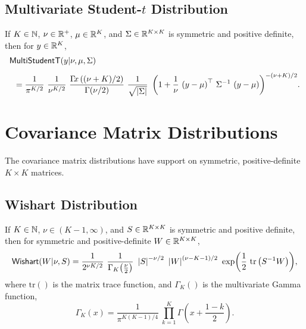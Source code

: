 \subsection{Multivariate Student-$t$ Distribution}

If $K \in \mathbb{N}$, $\nu \in \mathbb{R}^+$, $\mu \in \mathbb{R}^K$, and $\Sigma
\in \mathbb{R}^{K \times K}$ is symmetric and positive definite, then for
$y \in \mathbb{R}^K$,
\[
\begin{array}{l}
\mbox{\sf MultiStudentT}(y|\nu,\mu,\Sigma)
\\[8pt]
\displaystyle
\hspace*{8pt}
=
\frac{1}{\pi^{K/2}}
\
\frac{1}{\nu^{K/2}}
\
\frac{\Gamma\!x\left((\nu + K)/2\right)}
     {\Gamma(\nu/2)}
\
\frac{1}{\sqrt{\left| \Sigma \right|}}
\
\left(
1 + \frac{1}{\nu} \, \left(y - \mu\right)^{\top} \, \Sigma^{-1} \, \left(y - \mu\right)
\right)^{-(\nu + K)/2}
\! .
\end{array}
\]
\vspace*{4pt}

\begin{description}
%
%
\end{description}



\section{Covariance Matrix Distributions}

The covariance matrix distributions have support on symmetric,
positive-definite $K \times K$ matrices.

\subsection{Wishart Distribution}

If $K \in \mathbb{N}$, $\nu \in (K-1,\infty)$, and $S \in \mathbb{R}^{K \times K}$ is symmetric
and positive definite, then for symmetric and positive-definite $W \in
\mathbb{R}^{K \times K}$,
\[
\mbox{\sf Wishart}(W|\nu,S)
=
\frac{1}{2^{\nu K / 2}}
\
\frac{1}{\Gamma_K \! \left( \frac{\nu}{2} \right)}
\
\left| S \right|^{-\nu/2}
\
\left| W \right|^{(\nu - K - 1)/2}
\
\exp \! \left(\frac{1}{2} \ \mbox{tr}\left( S^{-1} W \right) \right)
\! ,
\]
%
where $\mbox{tr}()$ is the matrix trace function, and $\Gamma_K()$ is
the multivariate Gamma function,
\[
\Gamma_K(x) = 
\frac{1}{\pi^{K(K-1)/4}}
\
\prod_{k=1}^K \Gamma \left( x + \frac{1 - k}{2} \right)
\!.
\]

